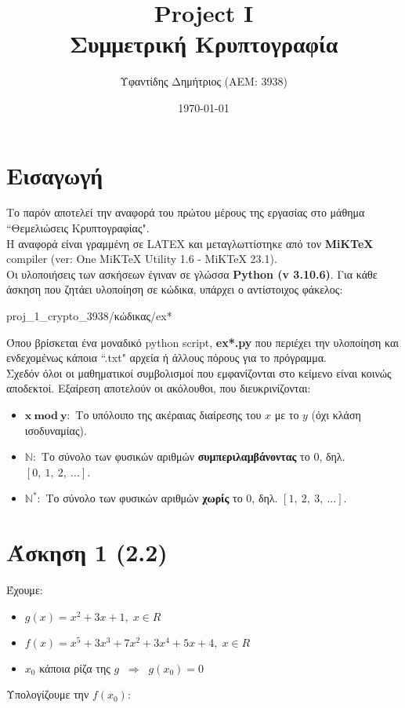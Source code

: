 \documentclass[12pt]{article}
\title{\textbf{{\lt Project I} \\ Συμμετρική Κρυπτογραφία}}
\author{Υφαντίδης Δημήτριος (ΑΕΜ: 3938)}
\date{\today}
\newcommand{\lt}{\latintext}
\begin{document}
\maketitle

\section*{Εισαγωγή}

Το παρόν αποτελεί την αναφορά του πρώτου μέρους της εργασίας 
στο μάθημα {\lt ``}Θεμελιώσεις Κρυπτογραφίας{\lt "}. \\

\noindent
Η αναφορά είναι γραμμένη σε {\lt LATEX} και μεταγλωττίστηκε 
από τον {\lt \textbf{MiKTeX} compiler (ver: One MiKTeX Utility 
1.6 - MiKTeX 23.1)}. \\

\noindent
Οι υλοποιήσεις των ασκήσεων έγιναν σε γλώσσα 
\textbf{\lt Python (v 3.10.6)}. Για κάθε άσκηση που 
ζητάει υλοποίηση σε κώδικα, υπάρχει ο αντίστοιχος φάκελος:
\begin{center}
{\lt proj\_1\_crypto\_3938}/κώδικας/{\lt ex*}
\end{center}
Όπου βρίσκεται ένα μοναδικό {\lt python script, 
\textbf{ex*.py}} που περιέχει την υλοποίηση και ενδεχομένως 
κάποια {\lt ``.txt"} αρχεία ή άλλους πόρους για το πρόγραμμα. \\

\vspace{0.2cm}
\noindent
Σχεδόν όλοι οι μαθηματικοί συμβολισμοί που εμφανίζονται 
στο κείμενο είναι κοινώς αποδεκτοί. Εξαίρεση αποτελούν 
οι ακόλουθοι, που διευκρινίζονται:
\begin{itemize}
	\item $\mathbf{x\:mod\:y:}$ Το υπόλοιπο της ακέραιας διαίρεσης του $x$ με το $y$ (όχι κλάση ισοδυναμίας).
	\item $\mathbf{\mathbb{N}}:$ Το σύνολο των φυσικών αριθμών \textbf{συμπεριλαμβάνοντας} το 0, δηλ. $[0,\:1,\:2,\:...]$.
	\item $\mathbf{\mathbb{N}^{*}}:$ Το σύνολο των φυσικών αριθμών \textbf{χωρίς} το 0, δηλ. $[1,\:2,\:3,\:...]$.
\end{itemize}

\pagebreak

\section*{Άσκηση 1 (2.2)}
Έχουμε:
\begin{itemize}
	\item $g(x) = x^{2} + 3x + 1,\; x \in R$
	\item $f(x) = x^{5} + 3x^{3} + 7x^{2} + 3x^{4} + 5x + 4,\; x \in R$
	\item $x_{0}$ κάποια ρίζα της $g\;\;\Rightarrow\;\; g(x_{0}) = 0$
\end{itemize}
Υπολογίζουμε την $f(x_{0})$:
\end{document}
